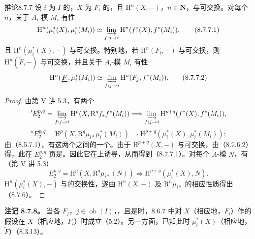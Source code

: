 \begin{SGAresult}{推论}{8.7.7}
设 $i$ 为 $I$ 的，$X$ 为 $F_i$ 的，且 $\mathrm H^n(X,-)$，$n\in\mathbf N$，与可交换。对每个 $n$，关于 $A_i$-模 $M_i$ 有性
\[
 \mathrm H^n(\mu_i^*(X),\mu_i^*(M_i))\simeq
 \varinjlim_{f:j\to i}\mathrm H^n(f^*(X),f^*(M_i)),\tag{8.7.7.1}
\]
且 $\mathrm H^n(\mu_i^*(X),-)$ 与可交换。特别地，若 $\mathrm H^n(F_i,-)$ 与可交换，则 $\mathrm H^n(\underleftarrow F,-)$ 与可交换，并且关于 $A_i$-模 $M_i$ 有性
\[
 \mathrm H^n(\underleftarrow F,\mu_i^*(M_i))\simeq
 \varinjlim_{f:j\to i}\mathrm H^n(F_j,f^*(M_i)).\tag{8.7.7.2}
\]
\end{SGAresult}
\begin{proof}
由第 V 讲 5.3，有两个
\[
 {}'E_2^{p,q}=\varinjlim_{f:j\to i}\mathrm H^p(X,\mathrm R^qf_*f^*(M_i))
 \Longrightarrow\varinjlim_{f:j\to i}\mathrm H^{p+q}(f^*(X),f^*(M_i)),
\]
\[
 {}''E_2^{p,q}=\mathrm H^p(X,\mathrm R^q\mu_{i*}\mu_i^*(M_i))
 \Longrightarrow\mathrm H^{p+q}(\mu_i^*(X),\mu_i^*(M_i));
\]
由（8.5.7.1），有这两个之间的一个。由于 $\mathrm H^{p+q}(X,-)$ 与可交换，由（8.7.6.2）得，此在 $E_2^{p,q}$ 页是。因此它在上诱导，从而得到（8.7.7.1）。对每个 $\underrightarrow A$-模 $N$，有（第 V 讲 5.3）
\[
 E_2^{p,q}=\mathrm H^p(X,\mathrm R^q\mu_{i*}(N))
 \Longrightarrow\mathrm H^{p+q}(\mu_i^*(X),N).
\]
 $\mathrm H^n(\mu_i^*(X),-)$ 与的交换性，遂由 $\mathrm H^n(X,-)$ 及 $\mathrm R^n\mu_{i*}$ 的相应性质得出（8.7.6）。
\end{proof}

\textbf{注记 8.7.8。} 当各 $F_j$，$j\in\operatorname{ob}(I)$，，且是时，8.6.7 中对 $X$（相应地，$F_i$）作的假设在 $X$（相应地，$F_i$）时成立（5.2）。另一方面，已知此时 $\mu_i^*(X)$（相应地，$\underleftarrow F$）（8.3.13）。

